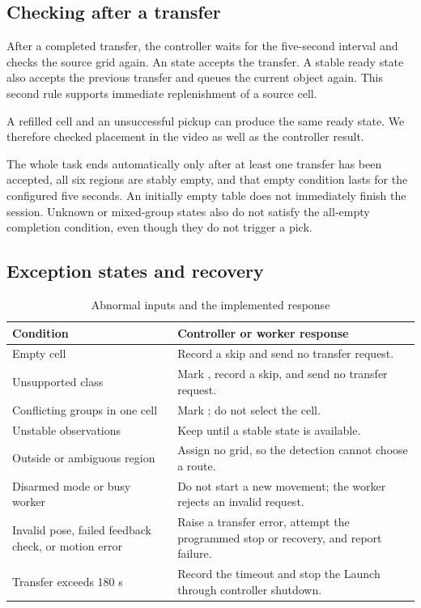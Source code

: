 \subsection{Checking after a transfer}
After a completed transfer, the controller waits for the five-second interval and checks the source grid again. An  state accepts the transfer. A stable ready state also accepts the previous transfer and queues the current object again. This second rule supports immediate replenishment of a source cell.

A refilled cell and an unsuccessful pickup can produce the same ready state. We therefore checked placement in the video as well as the controller result.

The whole task ends automatically only after at least one transfer has been accepted, all six regions are stably empty, and that empty condition lasts for the configured five seconds. An initially empty table does not immediately finish the session. Unknown or mixed-group states also do not satisfy the all-empty completion condition, even though they do not trigger a pick.

\subsection{Exception states and recovery}
\begin{table}[H]\tabstart
\caption{Abnormal inputs and the implemented response}
\begin{tabularx}{\textwidth}{@{}L{3.1cm}Y@{}}
\toprule Condition & Controller or worker response\\\midrule
Empty cell & Record a skip and send no transfer request.\\
Unsupported class & Mark , record a skip, and send no transfer request.\\
Conflicting groups in one cell & Mark ; do not select the cell.\\
Unstable observations & Keep  until a stable state is available.\\
Outside or ambiguous region & Assign no grid, so the detection cannot choose a route.\\
Disarmed mode or busy worker & Do not start a new movement; the worker rejects an invalid request.\\
Invalid pose, failed feedback check, or motion error & Raise a transfer error, attempt the programmed stop or recovery, and report failure.\\
Transfer exceeds 180 s & Record the timeout and stop the Launch through controller shutdown.\\
\bottomrule
\end{tabularx}
\end{table}

